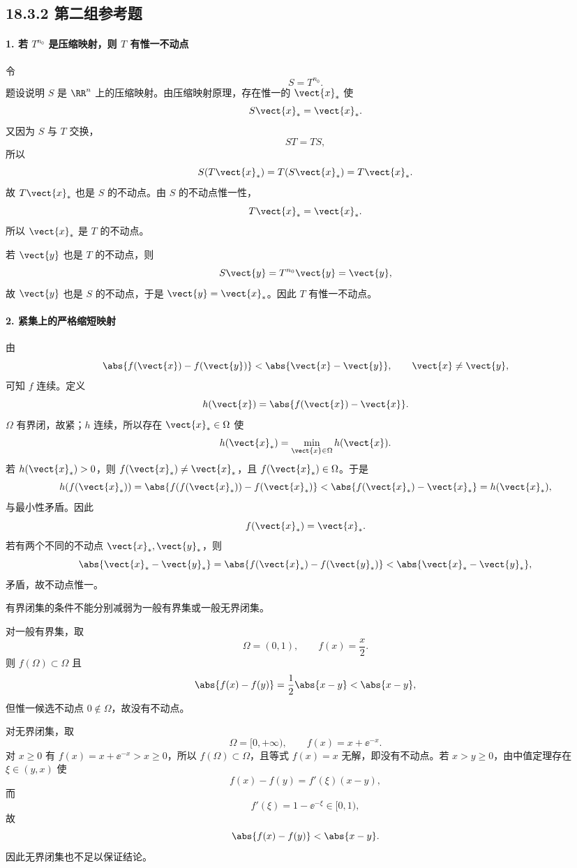 \subsection*{18.3.2 第二组参考题}

\paragraph{1. 若 $T^{n_0}$ 是压缩映射，则 $T$ 有惟一不动点}
\begin{xsolution}
令
\[
  S=T^{n_0}.
\]
题设说明 $S$ 是 $\RR^n$ 上的压缩映射。由压缩映射原理，存在惟一的 $\vect{x}_*$ 使
\[
  S\vect{x}_*=\vect{x}_*.
\]
又因为 $S$ 与 $T$ 交换，
\[
  ST=TS,
\]
所以
\[
  S(T\vect{x}_*)=T(S\vect{x}_*)=T\vect{x}_*.
\]
故 $T\vect{x}_*$ 也是 $S$ 的不动点。由 $S$ 的不动点惟一性，
\[
  T\vect{x}_*=\vect{x}_*.
\]
所以 $\vect{x}_*$ 是 $T$ 的不动点。

若 $\vect{y}$ 也是 $T$ 的不动点，则
\[
  S\vect{y}=T^{n_0}\vect{y}=\vect{y},
\]
故 $\vect{y}$ 也是 $S$ 的不动点，于是 $\vect{y}=\vect{x}_*$。因此 $T$ 有惟一不动点。
\end{xsolution}

\paragraph{2. 紧集上的严格缩短映射}
\begin{xsolution}
由
\[
  \abs{f(\vect{x})-f(\vect{y})}<\abs{\vect{x}-\vect{y}},
  \qquad\vect{x}\ne\vect{y},
\]
可知 $f$ 连续。定义
\[
  h(\vect{x})=\abs{f(\vect{x})-\vect{x}}.
\]
$\Omega$ 有界闭，故紧；$h$ 连续，所以存在 $\vect{x}_*\in\Omega$ 使
\[
  h(\vect{x}_*)=\min_{\vect{x}\in\Omega}h(\vect{x}).
\]
若 $h(\vect{x}_*)>0$，则 $f(\vect{x}_*)\ne\vect{x}_*$，且 $f(\vect{x}_*)\in\Omega$。于是
\[
  h(f(\vect{x}_*))
  =\abs{f(f(\vect{x}_*))-f(\vect{x}_*)}
  <\abs{f(\vect{x}_*)-\vect{x}_*}
  =h(\vect{x}_*),
\]
与最小性矛盾。因此
\[
  f(\vect{x}_*)=\vect{x}_*.
\]
若有两个不同的不动点 $\vect{x}_*,\vect{y}_*$，则
\[
  \abs{\vect{x}_*-\vect{y}_*}
  =\abs{f(\vect{x}_*)-f(\vect{y}_*)}
  <\abs{\vect{x}_*-\vect{y}_*},
\]
矛盾，故不动点惟一。

有界闭集的条件不能分别减弱为一般有界集或一般无界闭集。

对一般有界集，取
\[
  \Omega=(0,1),
  \qquad
  f(x)=\frac x2.
\]
则 $f(\Omega)\subset\Omega$ 且
\[
  \abs{f(x)-f(y)}=\frac12\abs{x-y}<\abs{x-y},
\]
但惟一候选不动点 $0\notin\Omega$，故没有不动点。

对无界闭集，取
\[
  \Omega=[0,+\infty),
  \qquad
  f(x)=x+\ee^{-x}.
\]
对 $x\ge0$ 有 $f(x)=x+\ee^{-x}>x\ge0$，所以 $f(\Omega)\subset\Omega$，且等式 $f(x)=x$ 无解，即没有不动点。若 $x>y\ge0$，由中值定理存在 $\xi\in(y,x)$ 使
\[
  f(x)-f(y)=f'(\xi)(x-y),
\]
而
\[
  f'(\xi)=1-\ee^{-\xi}\in[0,1),
\]
故
\[
  \abs{f(x)-f(y)}<\abs{x-y}.
\]
因此无界闭集也不足以保证结论。
\end{xsolution}


